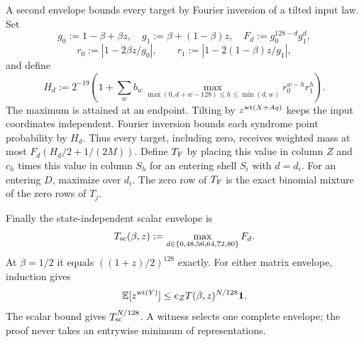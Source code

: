 A second envelope bounds every target by Fourier inversion of a tilted
input law. Set
\[
 g_0:=1-\beta+\beta z,\quad g_1:=\beta+(1-\beta)z,\quad
 F_d:=g_0^{128-d}g_1^d,
\]
\[
 r_0:=|1-2\beta z/g_0|,\qquad
 r_1:=|1-2(1-\beta)z/g_1|,
\]
and define
\[
 H_d:=2^{-19}\left(1+\sum_w b_w
 \max_{\max(0,d+w-128)\le h\le\min(d,w)}r_0^{w-h}r_1^h\right).
\]
The maximum is attained at an endpoint. Tilting by $z^{\operatorname{wt}(X+Aq)}$ keeps
the input coordinates independent. Fourier inversion bounds each syndrome
point probability by $H_d$. Thus every target, including zero, receives
weighted mass at most $F_d(H_d/2+1/(2M))$. Define $T_{\rm F}$ by placing
this value in column $Z$ and $c_h$ times this value in column $S_h$ for an
entering shell $S_i$ with $d=d_i$. For an entering $D$, maximize over $d_i$.
The zero row of $T_{\rm F}$ is the exact binomial mixture of the zero rows of $T_j$.

Finally the state-independent scalar envelope is
\[
 T_{\rm sc}(\beta,z):=\max_{d\in\{0,48,56,64,72,80\}}F_d.
\]
At $\beta=1/2$ it equals $((1+z)/2)^{128}$ exactly. For either matrix
envelope, induction gives
\begin{equation}
 \mathbb E[z^{\operatorname{wt}(Y)}]\le e_Z T(\beta,z)^{N/128}\mathbf 1.
 \label{eq:imt-moment}
\end{equation}
The scalar bound gives $T_{\rm sc}^{N/128}$. A witness selects one complete
envelope; the proof never takes an entrywise minimum of representations.
